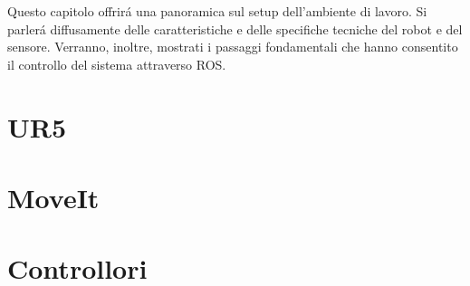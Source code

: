 Questo capitolo offrir\'{a} una panoramica sul setup dell'ambiente di lavoro. 
Si parler\'{a} diffusamente delle caratteristiche e delle specifiche tecniche del robot e del sensore. Verranno, inoltre, 
mostrati i passaggi fondamentali che hanno consentito il controllo del sistema attraverso ROS.

\section{UR5}


\section{MoveIt}


\section{Controllori}
